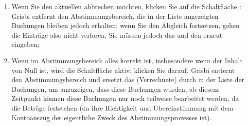 \begin{enumerate}
	\item Wenn Sie den aktuellen  abbrechen möchten, klicken Sie auf die Schaltfläche : Grisbi entfernt den Abstimmungsbereich, die in der Liste angezeigten Buchungen bleiben jedoch erhalten; wenn Sie den Abgleich fortsetzen, gehen die Einträge also nicht verloren; Sie müssen jedoch das  und den  erneut eingeben;
	\item Wenn im Abstimmungsbereich alles korrekt ist, insbesondere wenn der Inhalt von  Null ist, wird die Schaltfläche  aktiv; klicken Sie darauf. Grisbi entfernt den Abstimmungsbereich und ersetzt das  (Verrechnete) durch  in der Liste der Buchungen, um anzuzeigen, dass diese Buchungen  wurden; ab diesem Zeitpunkt können diese Buchungen nur noch teilweise bearbeitet werden, da die Beträge feststehen (da ihre Richtigkeit und Übereinstimmung mit dem Kontoauszug der eigentliche Zweck des Abstimmungsprozesses ist).

\end{enumerate}
